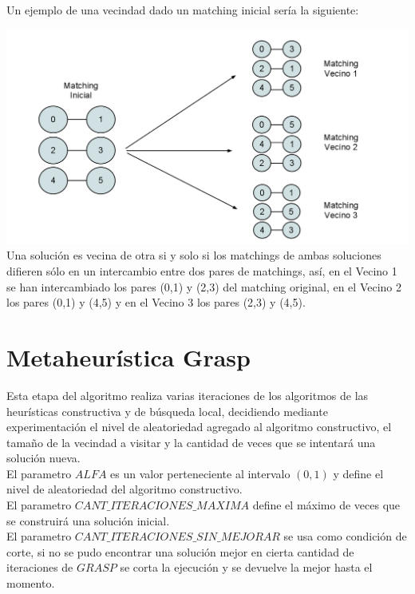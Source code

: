 \documentclass[11pt, a4paper, spanish]{article}
\begin{document}
\newpage
Un ejemplo de una vecindad dado un matching inicial ser\'ia la siguiente:

\begin{center}
\centering \includegraphics[scale=0.30]{img/MatchingVecindad.png}\\
\small{Una soluci\'on es vecina de otra si y solo si los matchings de ambas soluciones difieren s\'olo en un intercambio entre dos pares de matchings, as\'i, en el Vecino 1 se han intercambiado los pares (0,1) y (2,3) del matching original, en el Vecino 2 los pares (0,1) y (4,5) y en el Vecino 3 los pares (2,3) y (4,5).}
\end{center}

\newpage
\section{Metaheur\'istica Grasp}

Esta etapa del algoritmo realiza varias iteraciones de los algoritmos de las heur\'isticas constructiva y de b\'usqueda local, decidiendo mediante experimentaci\'on el nivel de aleatoriedad agregado al algoritmo constructivo, el tama\~{n}o de la vecindad a visitar y la cantidad de veces que se intentar\'a una soluci\'on nueva.\\
\noindent El parametro $ALFA$ es un valor perteneciente al intervalo $(0,1)$ y define el nivel de aleatoriedad del algoritmo constructivo.\\

\noindent El parametro $CANT\_ITERACIONES\_MAXIMA$ define el m\'aximo de veces que se construir\'a una soluci\'on inicial.\\

\noindent El parametro $CANT\_ITERACIONES\_SIN\_MEJORAR$ se usa como condici\'on de corte, si no se pudo encontrar una soluci\'on mejor en cierta cantidad de iteraciones de $GRASP$ se corta la ejecuci\'on y se devuelve la mejor hasta el momento.\\
\end{document}
